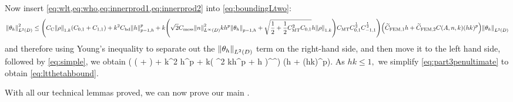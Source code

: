 Now insert \cref{eq:wlt,eq:who,eq:innerprod1,eq:innerprod2} into \cref{eq:boundingLtwo}:
\begin{align*}
\NLtD{\thetah}^2 \leq \mleft(\Cc \NW{\rho} \mleft(\Cfn{0,1} + \Cfn{1,1}\mright) + k^2 \Cfourteen \Nfn{p-1,h} h^p + k\mleft(\sqrt{2} \Cmess \NLiD{n}^2 kh^p \Nfn{p-1,h}{\thetah} + \sqrt{\half + \half\CMT^2 \Cfn{0,1}}h \NW{\rho}\mright)\CMT\Cfn{0,1}^{\half}\Cfn{-1,1}^{\half}\mright) \mleft(\CFEMotilde h + \CFEMttilde \CAnk (hk)^p\mright) \NLtD{\thetah}\\
\end{align*}
and therefore using Young's inequality to separate out the $\NLtD{\thetah}$ term on the right-hand side, and then move it to the left hand side, followed by \cref{eq:simple}, we obtain
\beq\label{eq:part3penultimate}
\NLtD{\thetah} \leq \mleft(\Cc \NW{\rho} \mleft( + \mright) + k^2 \Cfourteen {} h^p + k\mleft( \Cmess {}^2 kh^p  + h \NW{\rho}\mright)\CMT{}^{\half}^{\half}\mright) \mleft(\CFEMotilde h + \CFEMttilde \CAnk (hk)^p\mright).
\eeq
As $hk \leq 1,$ we simplify \cref{eq:part3penultimate} to obtain \cref{eq:ltthetahbound}.
\epf

With all our technical lemmas proved, we can now prove our main .

